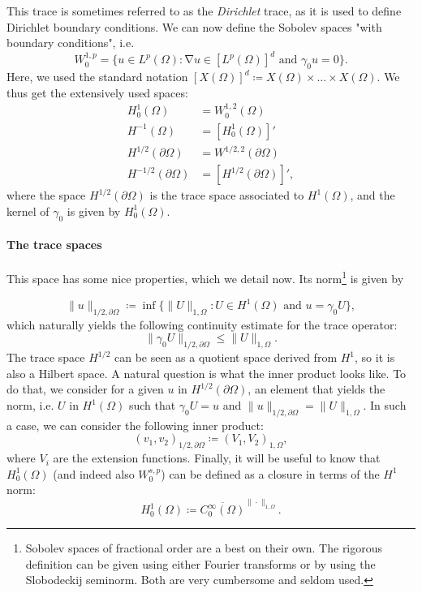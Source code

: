 \documentclass{article}
\DeclareMathOperator{\grad}{\nabla}
\begin{document}
This trace is sometimes referred to as the \emph{Dirichlet} trace, as it is used to define Dirichlet boundary conditions. We can now define the Sobolev spaces "with boundary conditions", i.e. 
    $$ W_0^{1,p} = \{ u \in L^p(\Omega): \grad u \in [L^p(\Omega)]^d \text{ and } \gamma_0 u = 0 \}. $$
Here, we used the standard notation $[X(\Omega)]^d \coloneqq X(\Omega)\times \hdots \times X(\Omega)$. We thus get the extensively used spaces: 
    $$
    \begin{aligned}
        H_0^1(\Omega) &= W_0^{1,2}(\Omega) \\
        H^{-1}(\Omega) &= [H_0^1(\Omega)]' \\
        H^{1/2}(\partial\Omega) &= W^{1/2,2}(\partial\Omega) \\
        H^{-1/2}(\partial\Omega) &= [H^{1/2}(\partial\Omega)]',
    \end{aligned}
    $$
where the space $H^{1/2}(\partial\Omega)$ is the trace space associated to $H^1(\Omega)$, and the kernel of $\gamma_0$ is given by $H_0^1(\Omega)$. 

\paragraph{The trace spaces} This space has some nice properties, which we detail now. Its norm\footnote{Sobolev spaces of fractional order are a best on their own. The rigorous definition can be given using either Fourier transforms or by using the Slobodeckij seminorm. Both are very cumbersome and seldom used.} is given by 

    $$ \| u \|_{1/2,\partial\Omega} \coloneqq \inf\{\|U\|_{1,\Omega}: U \in H^1(\Omega) \text{ and } u = \gamma_0 U\}, $$
which naturally yields the following continuity estimate for the trace operator: 
    $$ \| \gamma_0 U\|_{1/2,\partial\Omega} \leq \| U \|_{1,\Omega} . $$
The trace space $H^{1/2}$ can be seen as a quotient space derived from $H^1$, so it is also a Hilbert space. A natural question is what the inner product looks like. To do that, we consider for a given $u$ in $H^{1/2}(\partial\Omega)$, an element that yields the norm, i.e. $U$ in $H^1(\Omega)$ such that $\gamma_0 U = u$ and $\| u \|_{1/2,\partial\Omega} = \| U \|_{1,\Omega}$. In such a case, we can consider the following inner product: 
    $$ (v_1, v_2)_{1/2,\partial\Omega} \coloneqq (V_1, V_2)_{1,\Omega}, $$
where $V_i$ are the extension functions. Finally, it will be useful to know that $H_0^1(\Omega)$ (and indeed also $W_0^{s,p}$) can be defined as a closure in terms of the $H^1$ norm: 
    $$ H_0^1(\Omega) \coloneqq \overline{C_0^\infty(\Omega)}^{\|\cdot \|_{1,\Omega}}. $$
\end{document}
